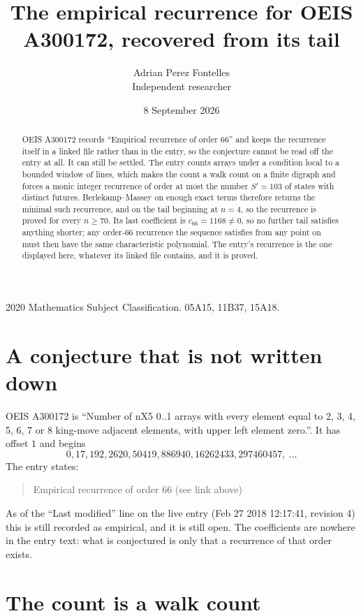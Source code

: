 \documentclass[11pt,a4paper]{article}
\title{The empirical recurrence for OEIS A300172, recovered from its tail}
\author{Adrian Perez Fontelles\\ \small Independent researcher}
\date{8 September 2026}
\theoremstyle{plain}
\theoremstyle{definition}
\begin{document}
\maketitle

\begin{abstract}
OEIS A300172 records ``Empirical recurrence of order $66$'' and keeps the recurrence itself in
a linked file rather than in the entry, so the conjecture cannot be read off the entry at all.
It can still be settled. The entry counts arrays under a condition local to a bounded window of
lines, which makes the count a walk count on a finite digraph and forces a monic integer
recurrence of order at most the number $S'=103$ of states with distinct futures. Berlekamp--Massey on
enough exact terms therefore returns the minimal such recurrence, and on the tail beginning at $n=4$, so the recurrence is proved for every $n\ge70$.
Its last coefficient is $c_{66}=1168\neq0$, so no further tail satisfies anything
shorter; any order-$66$ recurrence the sequence satisfies from any point on must then have
the same characteristic polynomial. The entry's recurrence is the one displayed here, whatever
its linked file contains, and it is proved.
\end{abstract}

\noindent\small 2020 Mathematics Subject Classification. 05A15, 11B37, 15A18.\normalsize

\section{A conjecture that is not written down}

OEIS A300172 is ``Number of nX5 0..1 arrays with every element equal to 2, 3, 4, 5, 6, 7 or 8 king-move adjacent elements, with upper left element zero.''. It has offset $1$ and begins
\[
0, 17, 192, 2620, 50419, 886940, 16262433, 297460457,\ \dots
\]
The entry states:
\begin{quote}
Empirical recurrence of order 66 (see link above)
\end{quote}
As of the ``Last modified'' line on the live entry (Feb 27 2018 12:17:41, revision 4)
this is still recorded as empirical, and it is still open. The coefficients are nowhere in the
entry text: what is conjectured is only that a recurrence of that order exists.

\section{The count is a walk count}
\end{document}
